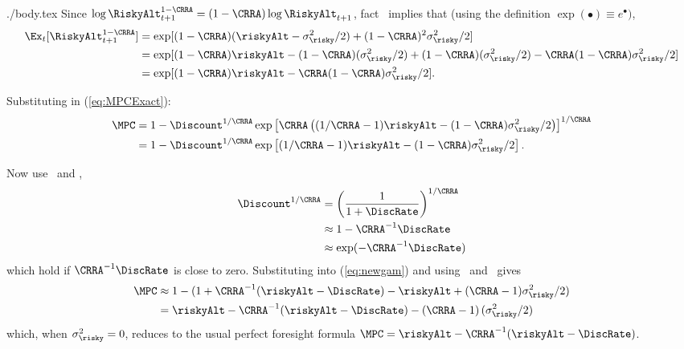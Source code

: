 \documentclass{handout}
\begin{document}
\begin{verbatimwrite}{./body.tex}
Since $\log \RiskyAlt_{t+1}^{1-\CRRA} = (1-\CRRA) \log \RiskyAlt_{t+1}$, fact \ELogNormTimes~implies that (using the definition $\exp(\bullet) \equiv e^{\bullet})$,
\begin{equation}\begin{gathered}\begin{aligned}
  \Ex_{t}[\RiskyAlt_{t+1}^{1-\CRRA}] & =  \exp[(1-\CRRA) ({\riskyAlt} -\sigma_{\risky}^{2}/2)+ (1-\CRRA)^{2} \sigma_{\risky}^{2} /2] \label{eq:ERportToTheOneMinusRho}
\\ & =  \exp[(1-\CRRA) {\riskyAlt} -(1-\CRRA)(\sigma_{\risky}^{2}/2)  + (1-\CRRA)(\sigma^{2}_{\risky}/2)  - \CRRA(1-\CRRA)\sigma_{\risky}^{2}/2] \notag \\ 
 & =  \exp[(1-\CRRA) {\riskyAlt} - \CRRA(1-\CRRA)\sigma_{\risky}^{2}/2]. 
\end{aligned}\end{gathered}\end{equation}

Substituting in (\ref{eq:MPCExact}):
\begin{equation}\begin{gathered}\begin{aligned}
\MPC & =  1- \Discount ^{1/\CRRA} \exp\left[\CRRA\left((1/\CRRA - 1){\riskyAlt} - (1-\CRRA)\sigma_{\risky}^{2}/2\right)\right]^{1/\CRRA} \notag
\\ & =  1- \Discount ^{1/\CRRA} \exp\left[(1/\CRRA - 1){\riskyAlt} - (1-\CRRA)\sigma_{\risky}^{2}/2\right] \label{eq:newgam}
.
\end{aligned}\end{gathered}\end{equation}


Now use \OverPlus~and \TaylorOne,
\begin{equation*}\begin{gathered}\begin{aligned}
        \Discount^{1/\CRRA} & =  \left(\frac{1}{1+\DiscRate}\right)^{1/\CRRA} 
\\       & \approx  1-\CRRA^{-1}\DiscRate  
\\       & \approx  \exp(-\CRRA^{-1}\DiscRate)
\end{aligned}\end{gathered}\end{equation*}
which hold if $\CRRA^{-1}\DiscRate$ is close to zero.  Substituting
into (\ref{eq:newgam}) and using \ExpPlus~and \LogEps~gives
\begin{equation}\begin{gathered}\begin{aligned}
        \MPC & \approx  1-(1+\CRRA^{-1}({\riskyAlt}-\DiscRate)-{\riskyAlt}+(\CRRA-1)\sigma_{\risky}^{2}/2)   \notag
\\       & =  {\riskyAlt}-\CRRA^{-1}({\riskyAlt}-\DiscRate) - \left(\CRRA-1\right)(\sigma_{\risky}^{2}/2) \label{eq:MPCApprox}
\end{aligned}\end{gathered}\end{equation}
which, when $\sigma^{2}_{\risky}=0$,  reduces to the usual perfect foresight formula $\MPC = \riskyAlt - \CRRA^{-1}(\riskyAlt - \DiscRate)$.


\end{verbatimwrite}
\end{document}
